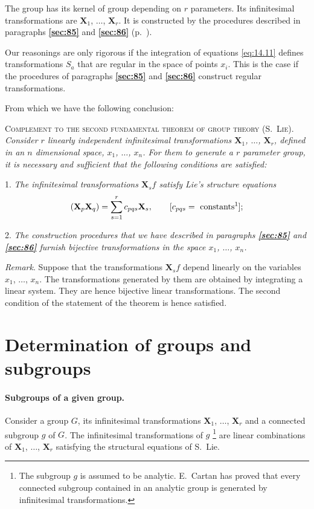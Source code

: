 \documentclass[leqno,11pt]{book}
\numberwithin{equation}{chapter}
\theoremstyle{shape1}
\theoremstyle{shapesmall}
\newcommand{\fsref}[1]{{\rm\textsection\textbf{\ref{sec:#1}}}}
\newcommand{\somespace}{\vspace{9pt}}
\begin{document}
The group has its kernel of group depending on $r$ parameters. Its infinitesimal transformations are $\mathbf{X}_{1}$, $\dots$, $\mathbf{X}_{r}$. It is constructed by the procedures described in paragraphs \fsref{85} and \fsref{86} (p.~\pageref{sec:85}).

Our reasonings are only rigorous if the integration of equations \eqref{eq:14.11} defines transformations $S_{a}$ that are regular in the space of points $x_{i}$. This is the case if the procedures of paragraphs \fsref{85} and \fsref{86} construct regular transformations.

From which we have the following conclusion:

\somespace

\textsc{Complement to the second fundamental theorem of group theory (S.\ Lie)}. \emph{Consider $r$ linearly independent infinitesimal transformations $\mathbf{X}_{1}$, $\dots$, $\mathbf{X}_{r}$, defined in an $n$ dimensional space, $x_{1}$, $\dots$, $x_{n}$. For them to generate a $r$ parameter group, it is necessary and sufficient that the following conditions are satisfied:}

\somespace

1. \emph{The infinitesimal transformations $\mathbf{X}_{s}f$ satisfy Lie's structure equations}
\[
(\mathbf{X}_{p}\mathbf{X}_{q})=\sum_{s=1}^{r}c_{pqs}\mathbf{X}_{s},\qquad[c_{pqs}=\text{ constants\footnotemark}];
\]

2. \emph{The construction procedures that we have described in paragraphs \fsref{85} and \fsref{86} furnish bijective transformations in the space $x_{1}$, $\dots$, $x_{n}$.}

\somespace

\emph{Remark}. Suppose that the transformations $\mathbf{X}_{s}f$ depend linearly on the variables $x_{1}$, $\dots$, $x_{n}$. The transformations generated by them are obtained by integrating a linear system. They are hence bijective linear transformations. The second condition of the statement of the theorem is hence satisfied.

\section{Determination of groups and subgroups}
\label{sec:determ-groups-subgr-1}

\paragraph{Subgroups of a given group.}
\label{sec:212}
Consider a group $G$, its infinitesimal transformations $\mathbf{X}_{1}$, $\dots$, $\mathbf{X}_{r}$ and a connected subgroup $g$ of $G$. The infinitesimal transformations of $g$ \footnote{The subgroup $g$ is assumed to be analytic. E.~Cartan has proved \cite{15} that every connected subgroup contained in an analytic group is generated by infinitesimal transformations.} are linear combinations of $\mathbf{X}_{1}$, $\dots$, $\mathbf{X}_{r}$ satisfying the structural equations of S.~Lie.
\end{document}
